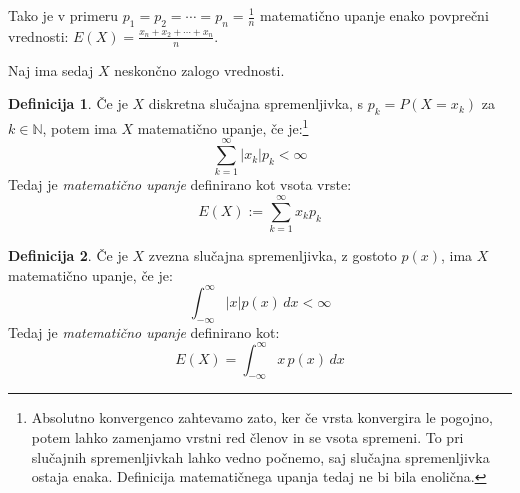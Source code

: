 \documentclass[12pt]{book}
\def\n{\noindent}
\theoremstyle{definition}
\newtheorem{definicija}{Definicija}
\theoremstyle{plain}
\theoremstyle{plain}
\theoremstyle{plain}
\theoremstyle{remark}
\begin{document}
\n Tako je v primeru $p_1=p_2=\cdots=p_n=\frac{1}{n}$ matematično upanje enako povprečni vrednosti: $E(X)=\frac{x_n+x_2+\cdots+x_n}{n}$. 

\n Naj ima sedaj $X$ neskončno zalogo vrednosti. 

\begin{definicija}
    Če je $X$ diskretna slučajna spremenljivka, s $p_k=P\left(X=x_k\right)$ za $k \in \mathbb{N}$, potem ima $X$ matematično upanje, če je:\footnote[1]{Absolutno konvergenco zahtevamo zato, ker če vrsta konvergira le pogojno, potem lahko zamenjamo vrstni red členov in se vsota spremeni. To pri slučajnih spremenljivkah lahko vedno počnemo, saj slučajna spremenljivka ostaja enaka. Definicija matematičnega upanja tedaj ne bi bila enolična.} 
    $$
    \sum_{k=1}^{\infty}\left|x_k\right| p_k<\infty 
    $$
    Tedaj je \emph{matematično upanje} definirano kot vsota vrste: 
    $$
    E(X):=\sum_{k=1}^{\infty} x_k p_k
    $$
\end{definicija}

\begin{definicija}
    Če je $X$ zvezna slučajna spremenljivka, z gostoto $p(x)$, ima $X$ matematično upanje, če je:
    $$
    \int_{-\infty}^{\infty}|x|  p(x) \, d x<\infty
    $$
    Tedaj je \emph{matematično upanje} definirano kot: 
    $$
    E(X)=\int_{-\infty}^{\infty} x \, p(x) \, d x
    $$
\end{definicija}
\end{document}

